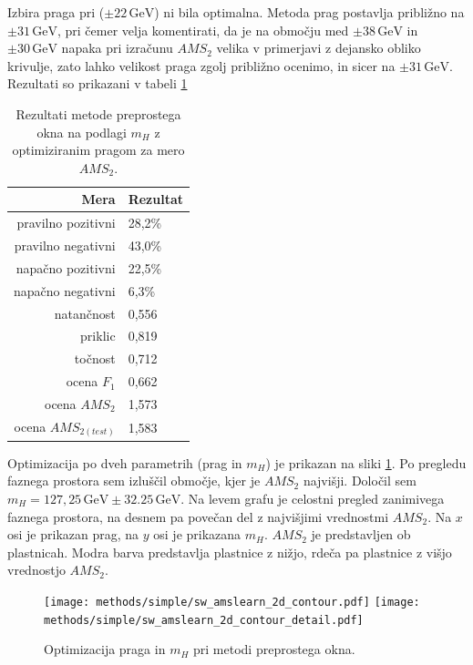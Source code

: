 \documentclass[11pt,a4paper,openany]{book}
\begin{document}
Izbira praga pri ($\pm 22\,\text{GeV}$) ni bila optimalna. Metoda prag postavlja približno na $\pm 31\,\text{GeV}$, pri čemer velja komentirati, da je na območju med $\pm 38\,\text{GeV}$ in $\pm 30\,\text{GeV}$ napaka pri izračunu $AMS_2$ velika v primerjavi z dejansko obliko krivulje, zato lahko velikost praga zgolj približno ocenimo, in sicer na $\pm 31\,\text{GeV}$. Rezultati so prikazani v tabeli \ref{tb:preprosto_okno_optimized}

\begin{table}[ht]
	\centering
	\begin{tabular}{rl}
		\hline
		\textbf{Mera} & \textbf{Rezultat} \\
		\hline
		pravilno pozitivni & 28,2\%\\
		pravilno negativni & 43,0\% \\
		napačno pozitivni & 22,5\% \\
		napačno negativni & 6,3\% \\
		natančnost & 0,556 \\
		priklic & 0,819 \\
		točnost & 0,712 \\
		ocena $F_1$ & 0,662 \\
		ocena $AMS_2$ & 1,573 \\
		ocena $AMS_{2(test)}$ & 1,583 		
	\end{tabular}
	\caption{Rezultati metode preprostega okna na podlagi $m_H$ z optimiziranim pragom za mero $AMS_2$.}
	\label{tb:preprosto_okno_optimized}
\end{table}

Optimizacija po dveh parametrih (prag in $m_H$) je prikazan na sliki \ref{sl:simple_optimization_2d}. Po pregledu faznega prostora sem izluščil območje, kjer je $AMS_2$ najvišji. Določil sem $m_H = 127,25\,\text{GeV} \pm 32.25\,\text{GeV}$. Na levem grafu je celostni pregled zanimivega faznega prostora, na desnem pa povečan del z najvišjimi vrednostmi $AMS_2$. Na $x$ osi je prikazan prag, na $y$ osi je prikazana $m_H$. $AMS_2$ je predstavljen ob plastnicah. Modra barva predstavlja plastnice z nižjo, rdeča pa plastnice z višjo vrednostjo $AMS_2$.

\begin{figure}[h]
	\centering	
	\texttt{[image: methods/simple/sw\_amslearn\_2d\_contour.pdf]}
	\texttt{[image: methods/simple/sw\_amslearn\_2d\_contour\_detail.pdf]}		
	
	\caption{Optimizacija praga in $m_H$ pri metodi preprostega okna.}
	\label{sl:simple_optimization_2d}
\end{figure}
\end{document}
